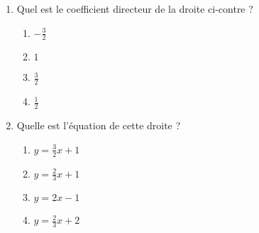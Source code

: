
\begin{exercice}\label{exosmath-0393}

    \begin{minipage}{0.485\textwidth}

        \begin{enumerate}
            \item
    Quel est le coefficient directeur de la droite ci-contre ?

        \begin{enumerate}
            \item
                \( -\frac{ 3 }{ 2 }\)
            \item
                \( 1\)
            \item
                \( \frac{ 3 }{ 2 }\)
            \item
                \( \frac{ 1 }{2}\)
        \end{enumerate}

    \item
        Quelle est l'équation de cette droite ?

        \begin{enumerate}
            \item
                \( y=\frac{ 3 }{2}x+1\)
            \item
                \( y=\frac{ 2 }{ 3 }x+1\)
            \item
                \( y=2x-1\)
            \item
                \( y=\frac{ 2 }{ 3 }x+2\)
        \end{enumerate}

        \end{enumerate}

    \end{minipage}
    \hspace{1mm}    
    \begin{minipage}{0.485\textwidth}
\begin{center}

\end{center}
    \end{minipage}

\end{exercice}
